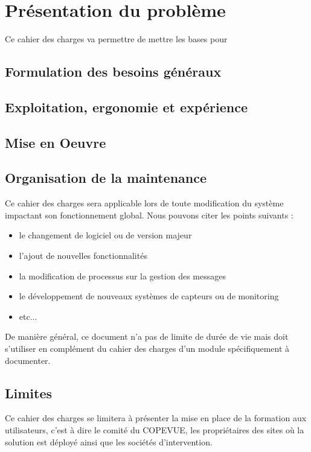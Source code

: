 \section{Présentation du problème}

Ce cahier des charges va permettre de mettre les bases pour 








\subsection{Formulation des besoins généraux}



\subsection{Exploitation, ergonomie et expérience}



\subsection{Mise en Oeuvre}


\subsection{Organisation de la maintenance}

Ce cahier des charges sera applicable lors de toute modification du système 
impactant son fonctionnement global. Nous pouvons citer les points suivants :
\begin{itemize}
\item le changement de logiciel ou de version majeur
\item l'ajout de nouvelles fonctionnalités
\item la modification de processus sur la gestion des messages
\item le développement de nouveaux systèmes de capteurs ou de monitoring
\item etc...
\end{itemize}

De manière général, ce document n'a pas de limite de durée de vie mais doit s'utiliser
en complément du cahier des charges d'un module spécifiquement à documenter.

\subsection{Limites}

Ce cahier des charges se limitera à présenter la mise en place de la formation 
aux utilisateurs, c'est à dire le comité du COPEVUE, les propriétaires des sites
où la solution est déployé ainsi que les sociétés d'intervention.
